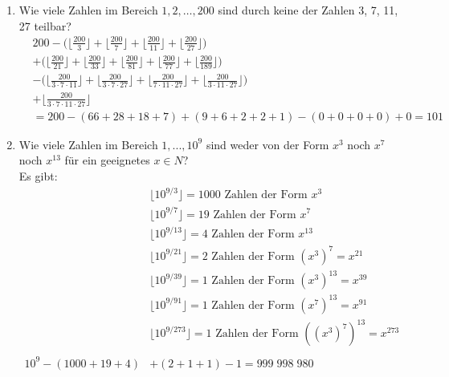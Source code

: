 \begin{enumerate}[label=(\alph*)]
        \item Wie viele Zahlen im Bereich $1, 2,\ldots, 200$ sind durch keine der Zahlen 3, 7, 11, 27 teilbar?\\
        \begin{align*}
	        &200 - \bigg(\bigg\lfloor\frac{200}{3}\bigg\rfloor + \bigg\lfloor\frac{200}{7}\bigg\rfloor
	         + \bigg\lfloor\frac{200}{11}\bigg\rfloor + \bigg\lfloor\frac{200}{27}\bigg\rfloor \bigg) \\
	         &+  \bigg(\bigg\lfloor\frac{200}{21}\bigg\rfloor + \bigg\lfloor\frac{200}{33}\bigg\rfloor 
	         + \bigg\lfloor\frac{200}{81}\bigg\rfloor + \bigg\lfloor\frac{200}{77}\bigg\rfloor
	         + \bigg\lfloor\frac{200}{189}\bigg\rfloor\bigg) \\ 
	         &-\bigg(\bigg\lfloor\frac{200}{3\cdot 7\cdot 11}
	         \bigg\rfloor+\bigg\lfloor\frac{200}{3\cdot 7\cdot 27}\bigg\rfloor + \bigg\lfloor\frac{200}{7\cdot 11\cdot 27}\bigg\rfloor +
	         \bigg\lfloor\frac{200}{3\cdot 11\cdot 27}\bigg\rfloor \bigg)  \\
	         &+ \bigg\lfloor\frac{200}{3\cdot 7\cdot 11 \cdot 27}\bigg\rfloor \\
	         &= 200 - (66+28+18+7) + (9 + 6 + 2 + 2 + 1) - (0 + 0 + 0 + 0) + 0 = 101
        \end{align*}
        \item Wie viele Zahlen im Bereich $1,...,10^9$ sind weder von der Form $x^3$ noch $x^7$ noch $x^{13}$
        für ein geeignetes $x \in N $?\\
         Es gibt: 
	    \begin{align*}
	    &\lfloor 10^{9/3}\rfloor = 1000  \text{ Zahlen der Form } x^3 \\
	    &\lfloor 10^{9/7}\rfloor= 19  \text{ Zahlen der Form }x^7 \\
	    &\lfloor 10^{9/13}\rfloor= 4  \text{ Zahlen der Form }x^{13} \\
	    &\lfloor 10^{9/21}\rfloor= 2  \text{ Zahlen der Form } (x^{3})^7 = x^{21} \\
	    &\lfloor 10^{9/39}\rfloor= 1  \text{ Zahlen der Form } (x^{3})^{13} = x^{39} \\
	    &\lfloor 10^{9/91}\rfloor= 1  \text{ Zahlen der Form } (x^{7})^{13} = x^{91} \\
	    &\lfloor 10^{9/273}\rfloor= 1  \text{ Zahlen der Form } ((x^{3})^7)^{13} = x^{273} \\
	    \\
	    10^9-(1000+19+4)&+(2+1+1)-1=999\; 998\; 980 \\\\\\ 
        \end{align*}
        \end{enumerate}

